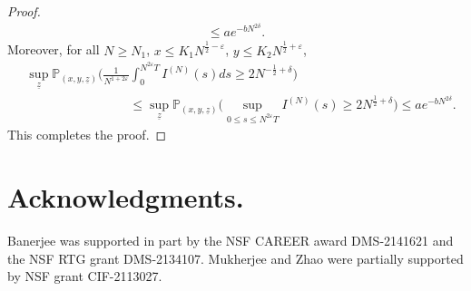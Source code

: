 \documentclass[11pt, reqno]{article}
\numberwithin{equation}{section}
\numberwithin{theorem}{section}
\begin{document}
\begin{appendix}
\begin{proof}
\begin{equation*}
\begin{split}
        \leq  a e^{-b N^{2\delta}}.
\end{split}
\end{equation*}
Moreover, for all $N\geq N_1$, $x\leq K_1N^{\frac{1}{2} - \varepsilon}$, $y\leq K_2 N^{\frac{1}{2}+\varepsilon}$,
\begin{align*}
    &\sup_{\underline{z}}\mathbb{P}_{(x, y, \underline{z})}\Big(\frac{1}{N^{1+2\varepsilon}}\int_0^{N^{2\varepsilon}T} I^{(N)}(s)ds\geq 2N^{-\frac{1}{2}+\delta}\Big)\\
    &\hspace{3cm}\quad\leq \sup_{\underline{z}}\mathbb{P}_{(x, y, \underline{z})}\Big(\sup_{0\leq s\leq N^{2\varepsilon}T}I^{(N)}(s)\geq 2N^{\frac{1}{2}+\delta}\Big)\leq ae^{-bN^{2\delta}}.
\end{align*}
This completes the proof. 
\end{proof}

\end{appendix}

%
%
%


\section*{Acknowledgments.}
Banerjee was supported in part by the NSF CAREER award DMS-2141621 and the NSF RTG grant DMS-2134107. Mukherjee and Zhao were partially supported by NSF grant CIF-2113027.








%

\end{document}
